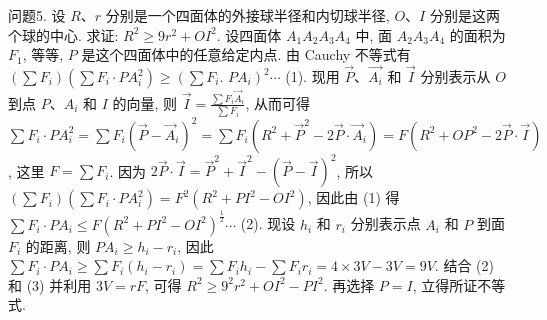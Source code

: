 问题5. 设 $R 、 r$ 分别是一个四面体的外接球半径和内切球半径, $O 、 I$ 分别是这两个球的中心.
求证: $R^2 \geqslant 9 r^2+O I^2$.
设四面体 $A_1 A_2 A_3 A_4$ 中, 面 $A_2 A_3 A_4$ 的面积为 $F_1$, 等等, $P$ 是这个四面体中的任意给定内点.
由 Cauchy 不等式有 $\left(\sum F_i\right)\left(\sum F_i \cdot P A_i^2\right) \geqslant\left(\sum F_i\right.$. $\left.P A_i\right)^2 \cdots$ (1). 现用 $\vec{P} 、 \overrightarrow{A_i}$ 和 $\vec{I}$ 分别表示从 $O$ 到点 $P 、 A_i$ 和 $I$ 的向量, 则 $\vec{I}= \frac{\sum F_i \vec{A}_i}{\sum F_i}$, 从而可得 $\sum F_i \cdot P A_i^2=\sum F_i\left(\vec{P}-\vec{A}_i\right)^2=\sum F_i\left(R^2+\vec{P}^2-\right. \left.2 \vec{P} \cdot \vec{A}_i\right)=F\left(R^2+O P^2-2 \vec{P} \cdot \vec{I}\right)$, 这里 $F=\sum F_i$. 因为 $2 \vec{P} \cdot \vec{I}= \vec{P}^2+\vec{I}^2-(\vec{P}-\vec{I})^2$, 所以 $\left(\sum F_i\right)\left(\sum F_i \cdot P A_i^2\right)=F^2\left(R^2+P I^2-O I^2\right)$, 因此由 (1) 得 $\sum F_i \cdot P A_i \leqslant F\left(R^2+P I^2-O I^2\right)^{\frac{1}{2}} \cdots$ (2). 现设 $h_i$ 和 $r_i$ 分别表示点 $A_i$ 和 $P$ 到面 $F_i$ 的距离, 则 $P A_i \geqslant h_i-r_i$, 因此 $\sum F_i \cdot P A_i \geqslant \sum F_i\left(h_i-r_i\right)= \sum F_i h_i-\sum F_i r_i=4 \times 3 V-3 V=9 V$. 结合 (2) 和 (3) 并利用 $3 V=r F$, 可得 $R^2 \geqslant 9^2 r^2+O I^2-P I^2$. 再选择 $P=I$, 立得所证不等式.


